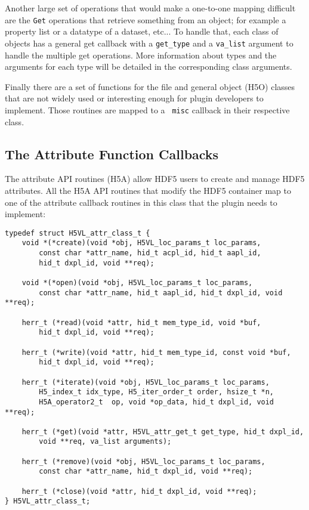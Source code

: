 Another large set of operations that would make a one-to-one mapping
difficult are the {\tt Get} operations that retrieve something from an
object; for example a property list or a datatype of a dataset,
etc... To handle that, each class of objects has a general get
callback with a {\tt get\_type} and a {\tt va\_list} argument to handle
the multiple get operations. More information about types and the
arguments for each type will be detailed in the corresponding class
arguments.

Finally there are a set of functions for the file and general object
(H5O) classes that are not widely used or interesting enough for
plugin developers to implement. Those routines are mapped to a {\tt
  misc} callback in their respective class.

\subsection{The Attribute Function Callbacks}
The attribute API routines (H5A) allow HDF5 users to create and manage
HDF5 attributes. All the H5A API routines that modify the HDF5
container map to one of the attribute callback routines in this
class that the plugin needs to implement:

\begin{lstlisting}
typedef struct H5VL_attr_class_t {
    void *(*create)(void *obj, H5VL_loc_params_t loc_params, 
        const char *attr_name, hid_t acpl_id, hid_t aapl_id, 
        hid_t dxpl_id, void **req);

    void *(*open)(void *obj, H5VL_loc_params_t loc_params, 
        const char *attr_name, hid_t aapl_id, hid_t dxpl_id, void **req);

    herr_t (*read)(void *attr, hid_t mem_type_id, void *buf, 
        hid_t dxpl_id, void **req);

    herr_t (*write)(void *attr, hid_t mem_type_id, const void *buf, 
        hid_t dxpl_id, void **req);

    herr_t (*iterate)(void *obj, H5VL_loc_params_t loc_params,
        H5_index_t idx_type, H5_iter_order_t order, hsize_t *n, 
        H5A_operator2_t  op, void *op_data, hid_t dxpl_id, void **req);

    herr_t (*get)(void *attr, H5VL_attr_get_t get_type, hid_t dxpl_id, 
        void **req, va_list arguments);

    herr_t (*remove)(void *obj, H5VL_loc_params_t loc_params, 
        const char *attr_name, hid_t dxpl_id, void **req);

    herr_t (*close)(void *attr, hid_t dxpl_id, void **req);
} H5VL_attr_class_t;
\end{lstlisting}

